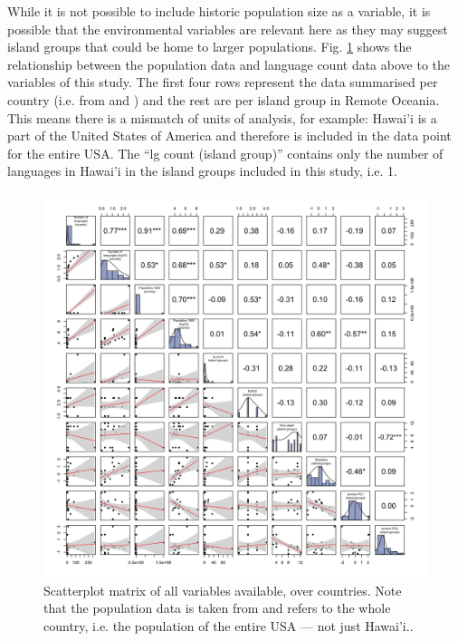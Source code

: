 \documentclass[unnumsec,webpdf,modern,medium]{oup-authoring-template}
\begin{document}
While it is not possible to include historic population size as a variable, it is possible that the environmental variables are relevant here as they may suggest island groups that could be home to larger populations. Fig. \ref{appendix_SPLOM_country_all_variables} shows the relationship between the population data and language count data above to the variables of this study. The first four rows represent the data summarised per country (i.e. from  \citet{UN_pop} and \citet{glottolog3}) and the rest are per island group in Remote Oceania. This means there is a mismatch of units of analysis, for example: Hawai'i is a part of the United States of America and therefore is included in the data point for the entire USA. The ``lg count (island group)'' contains only the number of languages in Hawai'i in the island groups included in this study, i.e. 1.

\begin{figure}[ht]
    \includegraphics[width=\textwidth]{SPLOM_country_all_variables.png}
\caption{Scatterplot matrix of all variables available, over countries. Note that the population data is taken from \citet{UN_pop} and refers to the whole country, i.e. the population of the entire USA --- not just Hawai'i..}
\label{appendix_SPLOM_country_all_variables}
\end{figure}
\end{document}
